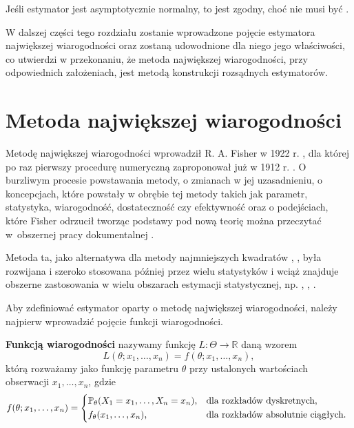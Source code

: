 Jeśli estymator jest asymptotycznie normalny, to jest zgodny, choć nie musi
być \textit{}.

W dalszej części tego rozdziału zostanie wprowadzone pojęcie estymatora największej wiarogodności oraz zostaną udowodnione dla niego jego właściwości, co utwierdzi w przekonaniu, że metoda największej wiarogodności, przy odpowiednich założeniach, jest metodą konstrukcji rozsądnych estymatorów.

\newpage 

\section{Metoda największej wiarogodności}

Metodę największej wiarogodności wprowadził R. A. Fisher w 1922 r. \cite{fisher2}, dla której po raz pierwszy procedurę numeryczną zaproponował już w 1912 r. \cite{fisher1}. O burzliwym procesie powstawania metody, o zmianach w jej uzasadnieniu, o koncepcjach, które powstały w obrębie tej metody takich jak parametr, statystyka, wiarogodność, dostateczność czy efektywność oraz o podejściach, które Fisher odrzucił tworząc podstawy pod nową teorię można przeczytać w~obszernej pracy dokumentalnej \cite{aldrich1}. 

Metoda ta, jako alternatywa dla metody najmniejszych kwadratów \cite{legendre1}, \cite{gauss1}, była rozwijana i szeroko stosowana później przez wielu statystyków i wciąż znajduje obszerne zastosowania w wielu obszarach estymacji statystycznej, np. \cite{hutch1}, \cite{kenward1}, \cite{millar1}.

Aby zdefiniować estymator oparty o metodę największej wiarogodności, należy najpierw wprowadzić pojęcie funkcji wiarogodności.

\begin{definition}
\textbf{Funkcją wiarogodności} nazywamy funkcję $L : \Theta \rightarrow \mathbb{R}$ daną wzorem $$ L(\theta;x_1, \dots , x_n) = f(\theta; x_1, \dots , x_n),$$
którą rozważamy jako funkcję parametru $\theta$ przy ustalonych wartościach obserwacji $x_1, \dots , x_n$, gdzie $$ f(\theta; x_1, \dots , x_n) = \begin{dcases*}
 \mathbb{P}_{\theta}( X_1 = x_1, \dots , X_n = x_n), & dla rozkładów dyskretnych,  \\
 f_{\theta}(x_1, \dots , x_n), & dla rozkładów absolutnie ciągłych.
\end{dcases*}$$

\end{definition}

